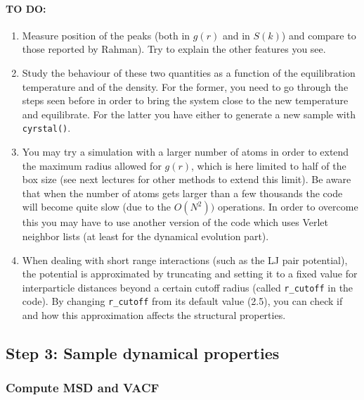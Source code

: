\documentclass[12pt]{article}
\begin{document}
\paragraph{TO DO:}
\begin{enumerate}
\item Measure position of the peaks (both in $g(r)$ and in $S(k)$) and compare to
those reported by Rahman). Try to explain the other features you see.

\item Study the behaviour of these two quantities as a function of the
equilibration temperature and of the density.
For the former, you need to go through the steps seen before in order to 
bring the system close to the new temperature and equilibrate. For the
latter you have either to generate a new sample with \verb!cyrstal()!.

\item You may try a simulation with a larger number of atoms in order to extend
the maximum radius allowed for $g(r)$, which is here limited to half of the
box size (see next lectures for other methods to extend this limit). 
Be aware that when the number of atoms gets larger than a few thousands the
code will become quite slow (due to the $O(N^2))$ operations. In order to
overcome this you may have to use another version of the code which uses
Verlet neighbor lists (at least for the dynamical evolution part).

\item When dealing with short range interactions (such as the LJ pair potential),
the potential is approximated by truncating and setting it to a fixed value
for interparticle distances beyond a certain cutoff radius (called
\verb!r_cutoff!  in the code). By changing \verb!r_cutoff! from its default value (2.5), 
you can check if and how this approximation affects the structural properties.  
\end{enumerate}


\subsection*{Step 3: Sample dynamical properties}
\subsubsection*{Compute MSD and VACF}
\end{document}
